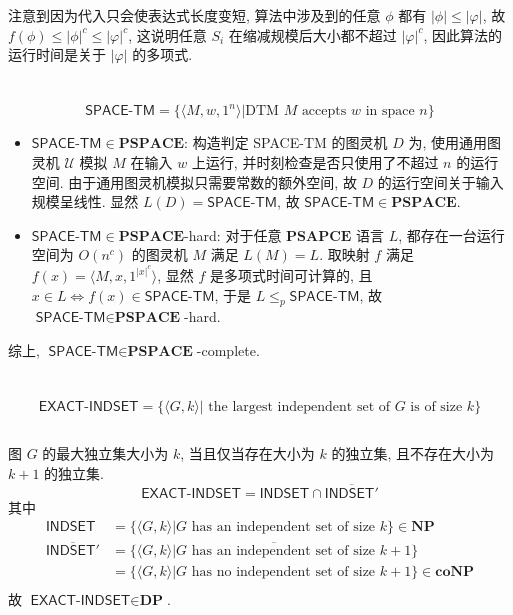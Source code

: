 \documentclass[8pt]{article}
\theoremstyle{compact}
\def\le{\leqslant}
\begin{document}
注意到因为代入只会使表达式长度变短, 算法中涉及到的任意 $\phi$ 都有 $|\phi| \le |\varphi|$, 故 $f(\phi) \le |\phi|^c \le |\varphi|^c$, 这说明任意 $S_i$ 在缩减规模后大小都不超过 $|\varphi|^c$, 因此算法的运行时间是关于 $|\varphi|$ 的多项式.

\section{}
$$\textsf{SPACE-TM} = \{\langle M, w, 1^n \rangle | \text{DTM } M \text{ accepts } w \text{ in space } n\}$$
\begin{itemize}
	\item $\textsf{SPACE-TM} \in \mathbf{PSPACE}$: 构造判定 \textsf{SPACE-TM} 的图灵机 $D$ 为, 使用通用图灵机 $\mathcal U$ 模拟 $M$ 在输入 $w$ 上运行, 并时刻检查是否只使用了不超过 $n$ 的运行空间. 由于通用图灵机模拟只需要常数的额外空间, 故 $D$ 的运行空间关于输入规模呈线性. 显然 $L(D) = \textsf{SPACE-TM}$, 故 $\textsf{SPACE-TM} \in \mathbf{PSPACE}$.
	\item $\textsf{SPACE-TM} \in \mathbf{PSPACE}$-hard: 对于任意 $\textbf{PSAPCE}$ 语言 $L$, 都存在一台运行空间为 $O(n^c)$ 的图灵机 $M$ 满足 $L(M) = L$. 取映射 $f$ 满足 $f(x) = \langle M, x, 1^{|x|^c} \rangle$, 显然 $f$ 是多项式时间可计算的, 且 $x \in L \Leftrightarrow f(x) \in \textsf{SPACE-TM}$, 于是 $L \le_p \textsf{SPACE-TM}$, 故 $\textsf{SPACE-TM} \in \textbf{PSPACE}$-hard.
\end{itemize}

综上, $\textsf{SPACE-TM} \in \textbf{PSPACE}$-complete.

\section{}
$$\textsf{EXACT-INDSET} = \{\langle G, k \rangle | \text{ the largest independent set of } G \text{ is of size } k\}$$
\subsection{}
图 $G$ 的最大独立集大小为 $k$, 当且仅当存在大小为 $k$ 的独立集, 且不存在大小为 $k + 1$ 的独立集.
$$\textsf{EXACT-INDSET} = \textsf{INDSET} \cap \overline{\textsf{INDSET}'}$$
其中 \begin{equation*}
	\begin{split}
		\textsf{INDSET} &= \{\langle G, k \rangle | G \text{ has an independent set of size } k\} \in \textbf{NP} \\
		\overline{\textsf{INDSET}'} &= \overline{\{\langle G, k \rangle | G \text{ has an independent set of size } k + 1\}}\\
		&= \{\langle G, k \rangle | G \text{ has no independent set of size } k + 1\} \in \textbf{coNP} \\
	\end{split}
\end{equation*}
故 $\textsf{EXACT-INDSET} \in \textbf{DP}$.
\end{document}
